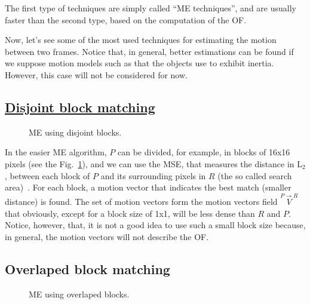 The first type of techniques are simply called ``ME techniques'', and
are usually faster than the second type, based on the computation of
the OF.


Now, let's see some of the most used techniques for estimating the
motion between two frames. Notice that, in general, better estimations
can be found if we suppose motion models such as that the objects use
to exhibit inertia. However, this case will not be considered for now.

\subsection{\href{https://vicente-gonzalez-ruiz.github.io/video_compression/\#x1-40003}{Disjoint block matching}}

\begin{figure}
  \centering
  \caption{ME using disjoint blocks.}
  \label{fig:simple}
\end{figure}

In the easier ME algorithm, $P$ can be divided, for example, in blocks
of 16x16 pixels (see the Fig.~\ref{fig:simple}), and we can use the
MSE, that measures the distance in L$_2$, between each block of $P$
and its surrounding pixels in $R$ (the so called search
area)~\cite{zhu2000new}. For each block, a motion vector that
indicates the best match (smaller distance) is found. The set of
motion vectors form the motion vectors field
$\overset{P\rightarrow R}{V}$ that obviously, except for a block size
of 1x1, will be less dense than $R$ and $P$. Notice, however, that, it
is not a good idea to use such a small block size because, in general,
the motion vectors will not describe the OF.

\subsection{Overlaped block matching}

\begin{figure}
  \centering
  \caption{ME using overlaped blocks.}
  \label{fig:overlaped}
\end{figure}

